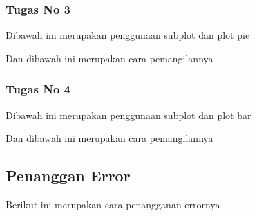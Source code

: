 \subsubsection{Tugas No 3}

\hfill \break

Dibawah ini merupakan penggunaan subplot dan plot pie

Dan dibawah ini merupakan cara pemangilannya



\subsubsection{Tugas No 4}

\hfill \break

Dibawah ini merupakan penggunaan subplot dan plot bar

Dan dibawah ini merupakan cara pemangilannya



\subsection{Penanggan Error}

\hfill \break

Berikut ini merupakan cara penangganan errornya
